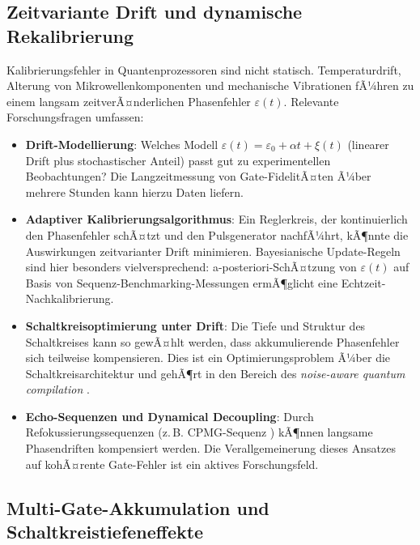 ﻿\documentclass[11pt,a4paper]{article}
\theoremstyle{definition}
\newcommand{\eps}{\varepsilon}
\begin{document}
\subsection{Zeitvariante Drift und dynamische Rekalibrierung}
\label{subsec:drift}

Kalibrierungsfehler in Quantenprozessoren sind nicht statisch.
Temperaturdrift, Alterung von Mikrowellenkomponenten und mechanische
Vibrationen fÃ¼hren zu einem langsam zeitverÃ¤nderlichen Phasenfehler
$\eps(t)$.  Relevante Forschungsfragen umfassen:

\begin{itemize}
  \item \textbf{Drift-Modellierung}: Welches Modell $\eps(t) = \eps_0 + \alpha t + \xi(t)$
        (linearer Drift plus stochastischer Anteil) passt gut zu experimentellen
        Beobachtungen?  Die Langzeitmessung von Gate-FidelitÃ¤ten Ã¼ber mehrere
        Stunden kann hierzu Daten liefern.

  \item \textbf{Adaptiver Kalibrierungsalgorithmus}: Ein Reglerkreis, der
        kontinuierlich den Phasenfehler schÃ¤tzt und den Pulsgenerator
        nachfÃ¼hrt, kÃ¶nnte die Auswirkungen zeitvarianter Drift minimieren.
        Bayesianische Update-Regeln sind hier besonders vielversprechend:
        a-posteriori-SchÃ¤tzung von $\eps(t)$ auf Basis von
        Sequenz-Benchmarking-Messungen \cite{Magesan2011} ermÃ¶glicht eine
        Echtzeit-Nachkalibrierung.

  \item \textbf{Schaltkreisoptimierung unter Drift}: Die Tiefe und
        Struktur des Schaltkreises kann so gewÃ¤hlt werden, dass akkumulierende
        Phasenfehler sich teilweise kompensieren.  Dies ist ein
        Optimierungsproblem Ã¼ber die Schaltkreisarchitektur und gehÃ¶rt
        in den Bereich des \emph{noise-aware quantum compilation} \cite{Murali2019}.

  \item \textbf{Echo-Sequenzen und Dynamical Decoupling}: Durch
        Refokussierungssequenzen (z.\,B. CPMG-Sequenz \cite{Carr1954}) kÃ¶nnen
        langsame Phasendriften kompensiert werden.  Die Verallgemeinerung
        dieses Ansatzes auf kohÃ¤rente Gate-Fehler ist ein aktives Forschungsfeld.
\end{itemize}

\subsection{Multi-Gate-Akkumulation und Schaltkreistiefeneffekte}
\label{subsec:accumulation}
\end{document}
